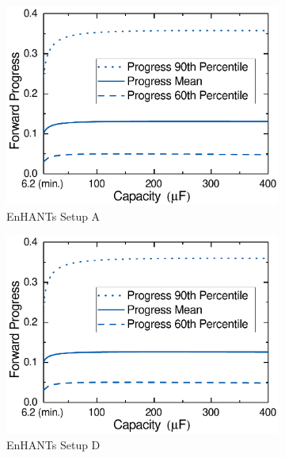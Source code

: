 \begin{figure}
    \centering
    \begin{subfigure}{0.49\columnwidth}
        \centering
        \includegraphics[width=\columnwidth]{ch4_sizingapproach/figures/HarvStorRan2Fig1}
        \caption{EnHANTs Setup A}
        \label{fig:harvstorrange1}
    \end{subfigure}
    \begin{subfigure}{0.49\columnwidth}
        \centering
        \includegraphics[width=\columnwidth]{ch4_sizingapproach/figures/HarvStorRan2Fig2}
        \caption{EnHANTs Setup D}
        \label{fig:harvstorrange2}
    \end{subfigure}
    \hfil
    \begin{subfigure}{0.49\columnwidth}

\end{subfigure}
\end{figure}
